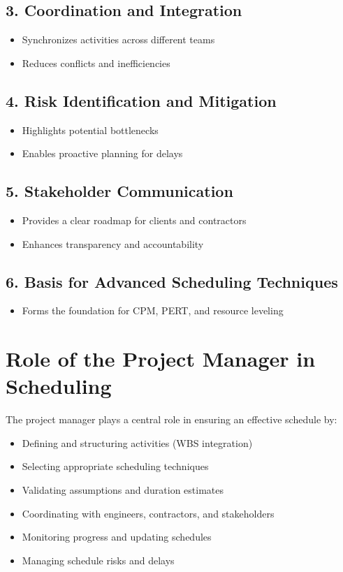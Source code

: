 \documentclass[12pt,a4paper]{article}
\begin{document}
\subsection*{3. Coordination and Integration}
\begin{itemize}
    \item Synchronizes activities across different teams
    \item Reduces conflicts and inefficiencies
\end{itemize}

\subsection*{4. Risk Identification and Mitigation}
\begin{itemize}
    \item Highlights potential bottlenecks
    \item Enables proactive planning for delays
\end{itemize}

\subsection*{5. Stakeholder Communication}
\begin{itemize}
    \item Provides a clear roadmap for clients and contractors
    \item Enhances transparency and accountability
\end{itemize}

\subsection*{6. Basis for Advanced Scheduling Techniques}
\begin{itemize}
    \item Forms the foundation for CPM, PERT, and resource leveling
\end{itemize}

\section*{Role of the Project Manager in Scheduling}
The project manager plays a central role in ensuring an effective schedule by:
\begin{itemize}
    \item Defining and structuring activities (WBS integration)
    \item Selecting appropriate scheduling techniques
    \item Validating assumptions and duration estimates
    \item Coordinating with engineers, contractors, and stakeholders
    \item Monitoring progress and updating schedules
    \item Managing schedule risks and delays
\end{itemize}
\end{document}
